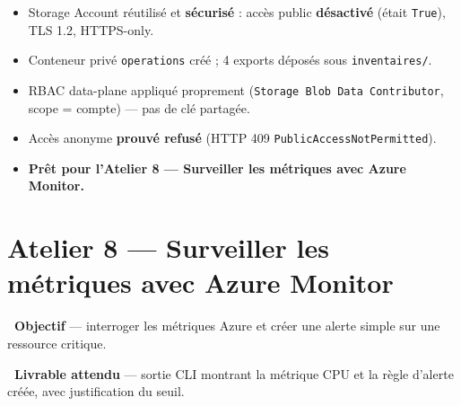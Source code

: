 \documentclass[11pt,a4paper]{article}
\newcommand{\emo}[1]{\raisebox{-0.14em}{\twemoji{#1}}}
\newcommand{\eTarget}{\emo{1f3af}}
\newcommand{\ePackage}{\emo{1f4e6}}
\newcommand{\code}[1]{\texttt{#1}}
\begin{document}
\begin{etatbox}
\begin{itemize}
  \item Storage Account réutilisé et \textbf{sécurisé} : accès public \textbf{désactivé} (était \code{True}), TLS 1.2, HTTPS-only.
  \item Conteneur privé \code{operations} créé ; 4 exports déposés sous \code{inventaires/}.
  \item RBAC data-plane appliqué proprement (\code{Storage Blob Data Contributor}, scope = compte) — pas de clé partagée.
  \item Accès anonyme \textbf{prouvé refusé} (HTTP 409 \code{PublicAccessNotPermitted}).
  \item \textbf{Prêt pour l'Atelier 8 — Surveiller les métriques avec Azure Monitor.}
\end{itemize}
\end{etatbox}


\section{Atelier 8 — Surveiller les métriques avec Azure Monitor}

\begin{fiche}
\textbf{\eTarget~Objectif} — interroger les métriques Azure et créer une alerte simple sur une ressource critique.

\textbf{\ePackage~Livrable attendu} — sortie CLI montrant la métrique CPU et la règle d'alerte créée, avec justification du seuil.
\end{fiche}
\end{document}
